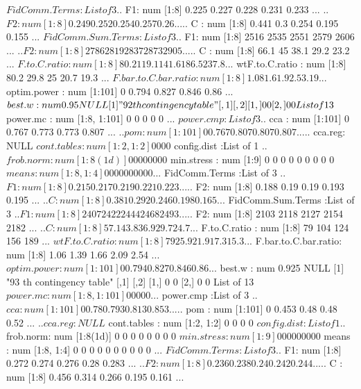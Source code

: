 \documentclass[11pt]{article} %
\begin{document}
\begin{Schunk}
\begin{Soutput}
 $ FidComm.Terms       :List of 3
  ..$ F1: num [1:8] 0.225 0.227 0.228 0.231 0.233 ...
  ..$ F2: num [1:8] 0.249 0.252 0.254 0.257 0.26 ...
  ..$ C : num [1:8] 0.441 0.3 0.254 0.195 0.155 ...
 $ FidComm.Sum.Terms   :List of 3
  ..$ F1: num [1:8] 2516 2535 2551 2579 2606 ...
  ..$ F2: num [1:8] 2786 2819 2837 2873 2905 ...
  ..$ C : num [1:8] 66.1 45 38.1 29.2 23.2 ...
 $ F.to.C.ratio        : num [1:8] 80.2 119.1 141.6 186.5 237.8 ...
 $ wtF.to.C.ratio      : num [1:8] 80.2 29.8 25 20.7 19.3 ...
 $ F.bar.to.C.bar.ratio: num [1:8] 1.08 1.6 1.9 2.5 3.19 ...
 $ optim.power         : num [1:101] 0 0.794 0.827 0.846 0.86 ...
 $ best.w              : num 0.95
NULL
[1] "92 th contingency table"
     [,1] [,2]
[1,]    0    0
[2,]    0    0
List of 13
 $ power.mc            : num [1:8, 1:101] 0 0 0 0 0 ...
 $ power.cmp           :List of 3
  ..$ cca    : num [1:101] 0 0.767 0.773 0.773 0.807 ...
  ..$ pom    : num [1:101] 0 0.767 0.807 0.807 0.807 ...
  ..$ cca.reg: NULL
 $ cont.tables         : num [1:2, 1:2] 0 0 0 0
 $ config.dist         :List of 1
  ..$ frob.norm: num [1:8(1d)] 0 0 0 0 0 0 0 0
 $ min.stress          : num [1:9] 0 0 0 0 0 0 0 0 0
 $ means               : num [1:8, 1:4] 0 0 0 0 0 0 0 0 0 0 ...
 $ FidComm.Terms       :List of 3
  ..$ F1: num [1:8] 0.215 0.217 0.219 0.221 0.223 ...
  ..$ F2: num [1:8] 0.188 0.19 0.19 0.193 0.195 ...
  ..$ C : num [1:8] 0.381 0.292 0.246 0.198 0.165 ...
 $ FidComm.Sum.Terms   :List of 3
  ..$ F1: num [1:8] 2407 2422 2444 2468 2493 ...
  ..$ F2: num [1:8] 2103 2118 2127 2154 2182 ...
  ..$ C : num [1:8] 57.1 43.8 36.9 29.7 24.7 ...
 $ F.to.C.ratio        : num [1:8] 79 104 124 156 189 ...
 $ wtF.to.C.ratio      : num [1:8] 79 25.9 21.9 17.3 15.3 ...
 $ F.bar.to.C.bar.ratio: num [1:8] 1.06 1.39 1.66 2.09 2.54 ...
 $ optim.power         : num [1:101] 0 0.794 0.827 0.846 0.86 ...
 $ best.w              : num 0.925
NULL
[1] "93 th contingency table"
     [,1] [,2]
[1,]    0    0
[2,]    0    0
List of 13
 $ power.mc            : num [1:8, 1:101] 0 0 0 0 0 ...
 $ power.cmp           :List of 3
  ..$ cca    : num [1:101] 0 0.78 0.793 0.813 0.853 ...
  ..$ pom    : num [1:101] 0 0.453 0.48 0.48 0.52 ...
  ..$ cca.reg: NULL
 $ cont.tables         : num [1:2, 1:2] 0 0 0 0
 $ config.dist         :List of 1
  ..$ frob.norm: num [1:8(1d)] 0 0 0 0 0 0 0 0
 $ min.stress          : num [1:9] 0 0 0 0 0 0 0 0 0
 $ means               : num [1:8, 1:4] 0 0 0 0 0 0 0 0 0 0 ...
 $ FidComm.Terms       :List of 3
  ..$ F1: num [1:8] 0.272 0.274 0.276 0.28 0.283 ...
  ..$ F2: num [1:8] 0.236 0.238 0.24 0.242 0.244 ...
  ..$ C : num [1:8] 0.456 0.314 0.266 0.195 0.161 ...

\end{Soutput}
\end{Schunk}
\end{document}
